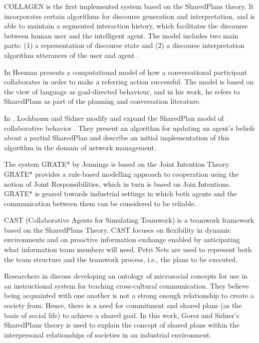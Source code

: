 \documentclass[11pt]{article}
\begin{document}
COLLAGEN \cite{rich:collaboration-manager,rich:discourse} is the first
implemented system based on the SharedPlans theory. It incorporates certain
algorithms for discourse generation and interpretation, and is able to maintain
a segmented interaction history, which facilitates the discourse between human
user and the intelligent agent. The model includes two main parts: (1) a
representation of discourse state and (2) a discourse interpretation algorithm
utterances of the user and agent \cite{rickel:discourse-theory-dialogue}.

In \cite{heeman:model-collaboration-referring} Heeman presents a computational
model of how a conversational participant collaborates in order to make a
referring action successful. The model is based on the view of language as
goal-directed behaviour, and in his work, he refers to SharedPlans as part of
the planning and conversation literature.

In \cite{lochbaum:plan-models}, Lochbaum and Sidner modify and expand the
SharedPlan model of collaborative behavior \cite{grosz:plans-discourse}. They
present an algorithm for updating an agent’s beliefs about a partial SharedPlan
and describe an initial implementation of this algorithm in the domain of
network management.

The system GRATE* by Jennings \cite{jennings:joint-intention-hybrid} is based on
the Joint Intention Theory. GRATE* provides a rule-based modelling approach to
cooperation using the notion of Joint Responsibilities, which in turn is based
on Join Intentions. GRATE* is geared towards industrial settings in which both
agents and the communication between them can be considered to be reliable.

CAST (Collaborative Agents for Simulating Teamwork) \cite{yen:cast}
\cite{yin:knowledge-based-sharedplans} is a teamwork framework based on the
SharedPlans Theory. CAST focuses on flexibility in dynamic environments and on
proactive information exchange enabled by anticipating what information team
members will need. Petri Nets are used to represent both the team structure and
the teamwork process, i.e., the plans to be executed.

Researchers in \cite{hobbs:microsociology-relationship} discuss developing an
ontology of microsocial concepts for use in an instructional system for teaching
cross-cultural communication. They believe being acquainted with one another is
not a strong enough relationship to create a society from. Hence, there is a
need for commitment and shared plans (as the basis of social life) to achieve a
shared goal. In this work, Gorsz and Sidner's SharedPlans theory
\cite{grosz:plans-discourse} is used to explain the concept of shared plans
within the interpersonal relationships of societies in an industrial
environment.
\end{document}
